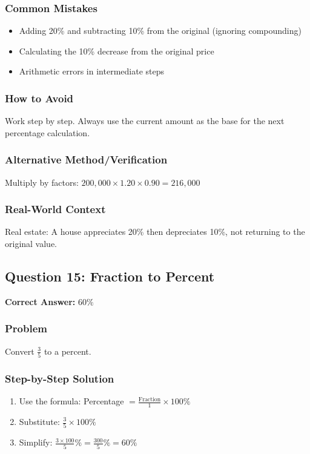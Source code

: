 \documentclass[12pt,a4paper]{article}
\begin{document}
\subsubsection*{Common Mistakes}
\begin{itemize}
    \item Adding 20\% and subtracting 10\% from the original (ignoring compounding)
    \item Calculating the 10\% decrease from the original price
    \item Arithmetic errors in intermediate steps
\end{itemize}

\subsubsection*{How to Avoid}
Work step by step. Always use the current amount as the base for the next percentage calculation.

\subsubsection*{Alternative Method/Verification}
Multiply by factors: $200,000 \times 1.20 \times 0.90 = 216,000$ 

\subsubsection*{Real-World Context}
Real estate: A house appreciates 20\% then depreciates 10\%, not returning to the original value.

\vspace{0.5cm}

\subsection*{Question 15: Fraction to Percent}

\textbf{Correct Answer:} $60\%$

\subsubsection*{Problem}
Convert $\frac{3}{5}$ to a percent.

\subsubsection*{Step-by-Step Solution}
\begin{enumerate}
    \item Use the formula: Percentage $= \frac{\text{Fraction}}{1} \times 100\%$
    \item Substitute: $\frac{3}{5} \times 100\%$
    \item Simplify: $\frac{3 \times 100}{5}\% = \frac{300}{5}\% = 60\%$
\end{enumerate}
\end{document}
